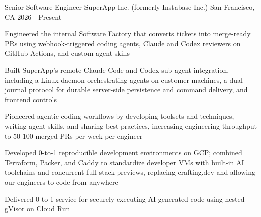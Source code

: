 

\begin{cventries}

  \cventry
    {Senior Software Engineer} %
    {SuperApp Inc. (formerly Instabase Inc.)} %
    {San Francisco, CA} %
    {2026 - Present} %
    {
      \begin{cvitems} %
        \item {Engineered the internal Software Factory that converts tickets into merge-ready PRs using webhook-triggered coding agents, Claude and Codex reviewers on GitHub Actions, and custom agent skills}
        \item {Built SuperApp's remote Claude Code and Codex sub-agent integration, including a Linux daemon orchestrating agents on customer machines, a dual-journal protocol for durable server-side persistence and command delivery, and frontend controls}
        \item {Pioneered agentic coding workflows by developing toolsets and techniques, writing agent skills, and sharing best practices, increasing engineering throughput to 50-100 merged PRs per week per engineer} 
        \item {Developed 0-to-1 reproducible development environments on GCP; combined Terraform, Packer, and Caddy to standardize developer VMs with built-in AI toolchains and concurrent full-stack previews, replacing crafting.dev and allowing our engineers to code from anywhere}
        \item {Delivered 0-to-1 service for securely executing AI-generated code using nested gVisor on Cloud Run}
      \end{cvitems}
    }


\end{cventries}
